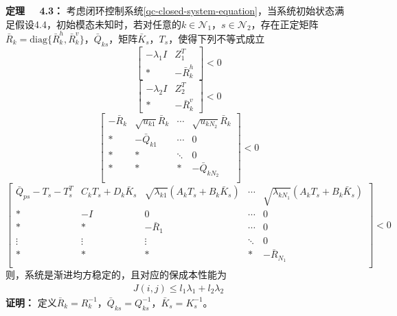 	{\bf 定理 \ \ 4.3：}
	考虑闭环控制系统\eqref{qc-closed-system-equation}，当系统初始状态满足假设4.4，初始模态未知时，若对任意的$k\in\mathcal{N}_{1}$，$s\in\mathcal{N}_2$，存在正定矩阵$\bar{R}_{k}=\mathrm{diag}\{\bar{R}^{h}_{k},\bar{R}^{v}_{k}\}$，$\bar{Q}_{ks}$，矩阵$\bar{K}_{s}$，$T_{s}$，使得下列不等式成立
	\begin{equation}\label{qcT3C1}
	\begin{bmatrix}
	-\lambda_1I &Z^{T}_1\\
	*&-\bar{R}^{h}_{k}
	\end{bmatrix}<0
	\end{equation}
	\begin{equation}\label{qcT3C2}
	\begin{bmatrix}
	-\lambda_2I &Z^{T}_{2}\\
	*&-\bar{R}^{v}_{k}
	\end{bmatrix}<0
	\end{equation}
	\begin{equation}\label{qcT3C3}
	\begin{bmatrix}
	-\bar{R}_{k}& \sqrt{u_{k1}}\bar{R}_{k} &\cdots&\sqrt{u_{kN_2}}\bar{R}_{k}\\
	*&-\bar{Q}_{k1}&\cdots&0\\
	*&*&\ddots&0\\
	*&*&*&-\bar{Q}_{kN_2}\\
	\end{bmatrix}<0
	\end{equation}
	\begin{equation}\label{qcT3C4}
	\begin{bmatrix}
		\bar{Q}_{ps}-T_{s}-T^{T}_{s} & C_{k}T_s+D_k\bar{K}_s& \sqrt{\lambda_{k1}}(A_kT_s+B_k\bar{K}_s)&\cdots&\sqrt{\lambda_{kN_1}}(A_kT_s+B_k\bar{K}_s)\\
				*&-I&0&\cdots&0\\
				*&*&-\bar{R}_1&\cdots&0\\
				\vdots&\vdots&\vdots&\ddots&0\\
				*&*&*&*&-\bar{R}_{N_1}\\
				
	\end{bmatrix}<0
	\end{equation}	
	则，系统是渐进均方稳定的，且对应的保成本性能为
	\begin{equation}
	\begin{split}
	J(i,j) \leq l_1\lambda_1 + l_2\lambda_2
	\end{split}
	\end{equation}
	{\bf 证明：} 定义$\bar{R}_{k}=R^{-1}_{k}$，$\bar{Q}_{ks}=Q^{-1}_{ks}$，$\bar{K}_s=K^{-1}_s$。
